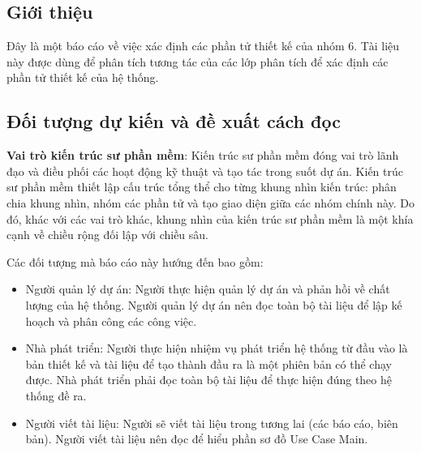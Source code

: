 \documentclass[./../main.tex]{subfiles}
\begin{document}
\subsection{Giới thiệu}

Đây là một báo cáo về việc xác định các phần tử thiết kế của nhóm 6.
Tài liệu này được dùng để phân tích tương tác của các lớp phân tích để xác định các phần tử thiết kế của hệ thống.

\subsection{Đối tượng dự kiến và đề xuất cách đọc}

\textbf{Vai trò kiến trúc sư phần mềm}: Kiến trúc sư phần mềm đóng vai trò lãnh đạo và điều phối các hoạt động kỹ thuật và tạo tác trong suốt dự án. Kiến trúc sư phần mềm thiết lập cấu trúc tổng thể cho từng khung nhìn kiến trúc: phân chia khung nhìn, nhóm các phần tử và tạo giao diện giữa các nhóm chính này. Do đó, khác với các vai trò khác, khung nhìn của kiến trúc sư phần mềm là một khía cạnh về chiều rộng đối lập với chiều sâu.

Các đối tượng mà báo cáo này hướng đến bao gồm:
\begin{itemize}
	\item Người quản lý dự án: Người thực hiện quản lý dự án và phản hồi về chất lượng của hệ thống. Người quản lý dự án nên đọc toàn bộ tài liệu để lập kế hoạch và phân công các công việc.
	\item Nhà phát triển: Người thực hiện nhiệm vụ phát triển hệ thống từ đầu vào là bản thiết kế và tài liệu để tạo thành đầu ra là một phiên bản có thể chạy được. Nhà phát triển phải đọc toàn bộ tài liệu để thực hiện đúng theo hệ thống đề ra.
	\item Người viết tài liệu: Người sẽ viết tài liệu trong tương lai (các báo cáo, biên bản). Người viết tài liệu nên đọc để hiểu phần sơ đồ Use Case Main.
\end{itemize}
\end{document}
